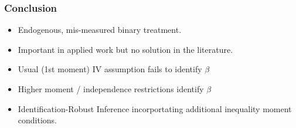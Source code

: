 \documentclass{beamer}
\begin{document}
%
%    
%
%

\begin{frame}
  \frametitle{Conclusion}

  \begin{itemize}
    \item Endogenous, mis-measured binary treatment.
    \item Important in applied work but no solution in the literature.
      \item Usual (1st moment) IV assumption fails to identify $\beta$
      \item Higher moment / independence restrictions identify $\beta$
      \item Identification-Robust Inference incorportating additional inequality moment conditions.
   \end{itemize}

\end{frame}
\appendix
\end{document}
